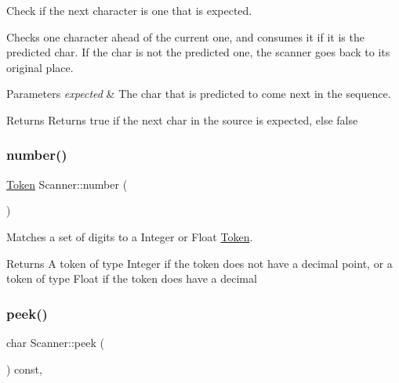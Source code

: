 Check if the next character is one that is expected. 

Checks one character ahead of the current one, and consumes it if it is the predicted char. If the char is not the predicted one, the scanner goes back to it\textquotesingle{}s original place. 
\begin{DoxyParams}{Parameters}
{\em expected} & The char that is predicted to come next in the sequence. \\
\hline
\end{DoxyParams}
\begin{DoxyReturn}{Returns}
Returns true if the next char in the source is expected, else false 
\end{DoxyReturn}
\mbox{\label{class_scanner_a57a954e1177976e9179432d2229f8868}} 
\subsubsection{\texorpdfstring{number()}{number()}}
{\footnotesize\ttfamily \hyperlink{struct_token}{Token} Scanner\+::number (\begin{DoxyParamCaption}{ }\end{DoxyParamCaption})\hspace{0.3cm}{\ttfamily [private]}}



Matches a set of digits to a Integer or Float \hyperlink{struct_token}{Token}. 

\begin{DoxyReturn}{Returns}
A token of type Integer if the token does not have a decimal point, or a token of type Float if the token does have a decimal 
\end{DoxyReturn}
\mbox{\label{class_scanner_aa5a6d5cab883f737f1ac799dd3434b4f}} 
\subsubsection{\texorpdfstring{peek()}{peek()}}
{\footnotesize\ttfamily char Scanner\+::peek (\begin{DoxyParamCaption}{ }\end{DoxyParamCaption}) const\hspace{0.3cm}{\ttfamily [inline]}, {\ttfamily [private]}}



